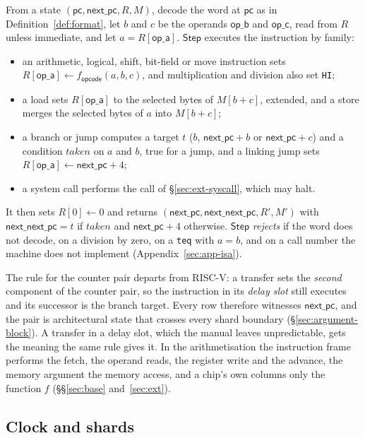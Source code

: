 \begin{definition}[Step]
\label{def:step}
From a state $(\mathsf{pc}, \mathsf{next\_pc}, R, M)$, decode the word at $\mathsf{pc}$ as in Definition~\ref{def:format}, let $b$ and $c$ be the operands $\mathsf{op\_b}$ and $\mathsf{op\_c}$, read from $R$ unless immediate, and let $a = R[\mathsf{op\_a}]$. $\mathsf{Step}$ executes the instruction by family:
\begin{itemize}
  \item an arithmetic, logical, shift, bit-field or move instruction sets $R[\mathsf{op\_a}] \gets f_{\mathsf{opcode}}(a, b, c)$, and multiplication and division also set \texttt{HI};
  \item a load sets $R[\mathsf{op\_a}]$ to the selected bytes of $M[b + c]$, extended, and a store merges the selected bytes of $a$ into $M[b + c]$;
  \item a branch or jump computes a target $t$ ($b$, $\mathsf{next\_pc} + b$ or $\mathsf{next\_pc} + c$) and a condition $\mathit{taken}$ on $a$ and $b$, true for a jump, and a linking jump sets $R[\mathsf{op\_a}] \gets \mathsf{next\_pc} + 4$;
  \item a system call performs the call of \S\ref{sec:ext-syscall}, which may halt.
\end{itemize}
It then sets $R[0] \gets 0$ and returns $(\mathsf{next\_pc}, \mathsf{next\_next\_pc}, R', M')$ with $\mathsf{next\_next\_pc} = t$ if $\mathit{taken}$ and $\mathsf{next\_pc} + 4$ otherwise. $\mathsf{Step}$ \emph{rejects} if the word does not decode, on a division by zero, on a \texttt{teq} with $a = b$, and on a call number the machine does not implement (Appendix~\ref{sec:app-isa}).
\end{definition}

The rule for the counter pair departs from RISC-V: a transfer sets the \emph{second} component of the counter pair, so the instruction in its \emph{delay slot} still executes and its successor is the branch target. Every row therefore witnesses $\mathsf{next\_pc}$, and the pair is architectural state that crosses every shard boundary (\S\ref{sec:argument-block}). A transfer in a delay slot, which the manual leaves unpredictable, gets the meaning the same rule gives it. In the arithmetisation the instruction frame performs the fetch, the operand reads, the register write and the advance, the memory argument the memory access, and a chip's own columns only the function $f$ (\S\S\ref{sec:base} and~\ref{sec:ext}).

\subsection{Clock and shards}
\label{sec:isa-record}

